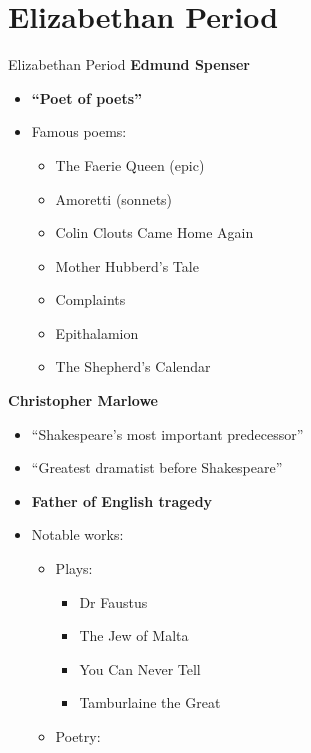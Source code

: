 \documentclass[
  12pt,
  ignorenonframetext,
  progressbar=frametitle]{beamer}
\providecommand{\tightlist}{%
  \setlength{\itemsep}{0pt}\setlength{\parskip}{0pt}}
\begin{document}
\section{Elizabethan Period}
\begin{frame}[allowframebreaks]
{Elizabethan Period}
\large\textbf{Edmund Spenser}\normalsize\vspace{-3mm}

\begin{itemize}
\tightlist
\item
  \textbf{``Poet of poets''}
\item
  Famous poems:

  \begin{itemize}
  \tightlist
  \item
    The Faerie Queen (epic)
  \item
    Amoretti (sonnets)
  \item
    Colin Clouts Came Home Again
  \item
    Mother Hubberd's Tale
  \item
    Complaints
  \item
    Epithalamion
  \item
    The Shepherd's Calendar
  \end{itemize}
\end{itemize}

\large\textbf{Christopher Marlowe}\normalsize\vspace{-3mm}

\begin{itemize}
\tightlist
\item
  ``Shakespeare's most important predecessor''
\item
  ``Greatest dramatist before Shakespeare''
\item
  \textbf{Father of English tragedy}
\item
  Notable works:

  \begin{itemize}
  \tightlist
  \item
    Plays:

    \begin{itemize}
    \tightlist
    \item
      Dr Faustus
    \item
      The Jew of Malta
    \item
      You Can Never Tell
    \item
      Tamburlaine the Great
    \end{itemize}
  \item
    Poetry:


\end{itemize}
\end{itemize}
\end{frame}
\end{document}
